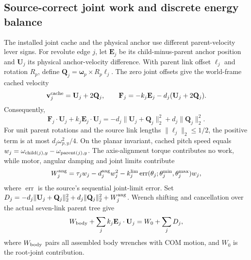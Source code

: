 \subsection{Source-correct joint work and discrete energy balance}
\label{app:joint_work}

The installed joint cache and the physical anchor use different parent-velocity lever signs.
For revolute edge $j$, let $\mathbf E_j$ be its child-minus-parent anchor position and $\mathbf U_j$ its physical anchor-velocity difference.
With parent link offset $\ell_j$ and rotation $R_p$, define $\mathbf Q_j=\boldsymbol\omega_p\times R_p\ell_j$.
The zero joint offsets give the world-frame cached velocity
\begin{equation}
 \mathbf v_j^{\rm cache}=\mathbf U_j+2\mathbf Q_j,
 \qquad \mathbf F_j=-k_j\mathbf E_j-d_j(\mathbf U_j+2\mathbf Q_j).
 \label{eq:joint_cache_work}
\end{equation}
Consequently,
\begin{equation}
 \mathbf F_j\cdot\mathbf U_j+k_j\mathbf E_j\cdot\mathbf U_j
   =-d_j\|\mathbf U_j+\mathbf Q_j\|_2^2+d_j\|\mathbf Q_j\|_2^2.
 \label{eq:joint_shift_work}
\end{equation}
For unit parent rotations and the source link lengths $\|\ell_j\|_2\le1/2$, the positive term is at most $d_j\omega_{p,y}^2/4$.
On the planar invariant, cached pitch speed equals $w_j=\omega_{{\rm child}(j),y}-\omega_{{\rm parent}(j),y}$.
The axis-alignment torque contributes no work, while motor, angular damping and joint limits contribute
\begin{equation}
 W_j^{\rm ang}=\tau_jw_j-d_j^{\rm ang}w_j^2
   -k_j^{\rm lim}\operatorname{err}(\theta_j;\theta_j^{\min},\theta_j^{\max})w_j,
\end{equation}
where $\operatorname{err}$ is the source's sequential joint-limit error.
Set $D_j=-d_j\|\mathbf U_j+\mathbf Q_j\|_2^2+d_j\|\mathbf Q_j\|_2^2+W_j^{\rm ang}$.
Wrench shifting and cancellation over the actual seven-link parent tree give
\begin{equation}
 W_{\rm body}+\sum_jk_j\mathbf E_j\cdot\mathbf U_j=W_0+\sum_jD_j,
 \label{eq:seven_joint_work}
\end{equation}
where $W_{\rm body}$ pairs all assembled body wrenches with COM motion, and $W_0$ is the root-joint contribution.

